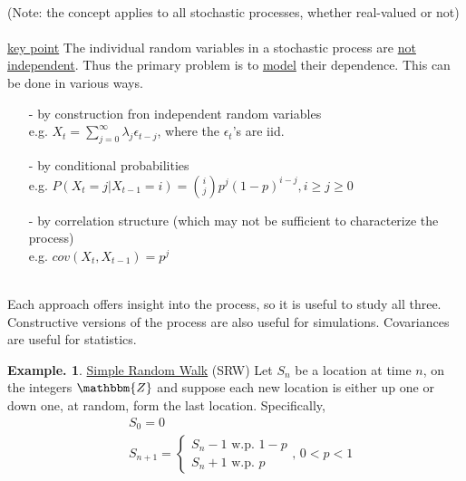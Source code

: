 \documentclass[12pt]{article}
\theoremstyle{definition}
\newtheorem{myexp}{Example.}[section]
\theoremstyle{plain}
\begin{document}
$\mbox{}$\\
(Note: the concept applies to all stochastic processes, whether real-valued or not)\\ \\
\underline{key point} The individual random variables in a stochastic process are \underline{not independent}. Thus the primary problem is to \underline{model} their dependence. This can be done in various ways.
\begin{itemize}
\item[-]  by construction fron independent random variables\\
e.g. $X_t = \sum_{j=0}^\infty \lambda_j \epsilon_{t-j}$, where the $\epsilon_t$'s are iid.
\item[-] by conditional probabilities\\
e.g. $P(X_t = j | X_{t-1} = i) = {i \choose j}p^j (1-p)^{i-j}, i \geq j \geq 0$ 
\item[-] by correlation structure (which may not be sufficient to characterize the process) \\
e.g. $cov(X_t, X_{t-1})=p^j$
\end{itemize}
$\mbox{}$\\
Each approach offers insight into the process, so it is useful to study all three. Constructive versions of the process are also useful for simulations. Covariances are useful for statistics.
\begin{myexp}
\underline{Simple Random Walk} (SRW)
Let $S_n$ be a location at time $n$, on the integers $\mathbbm{Z}$ and suppose each new location is either up one or down one, at random, form the last location. Specifically,\begin{displaymath}\begin{aligned}&S_0 = 0 \\ &S_{n+1} = \begin{cases}S_n - 1 \mbox{ w.p. $1-p$}\\S_n + 1  \mbox{ w.p. $p$}\end{cases} \mbox{, $0 < p <1$}\end{aligned} \end{displaymath}
\end{myexp}
\end{document}

